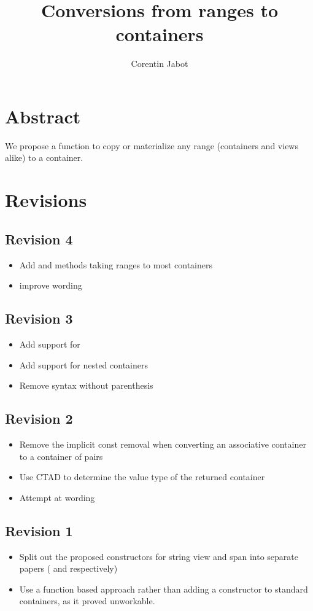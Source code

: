 \documentclass{wg21}
\title{Conversions from ranges to containers}
\author{Corentin Jabot}{corentin.jabot@gmail.com}
\begin{document}
\maketitle

\section{Abstract}

We propose a function to copy or materialize any range (containers and views alike) to a container.

\section{Revisions}

\subsection*{Revision 4}
\begin{itemize}
    \item Add  and methods taking ranges to most containers
    \item improve wording
\end{itemize}

\subsection*{Revision 3}
\begin{itemize}
    \item Add support for 
    \item Add support for nested containers
    \item Remove syntax without parenthesis
\end{itemize}

\subsection*{Revision 2}
\begin{itemize}
	\item Remove the implicit const removal when converting an associative container to a container of pairs
	\item Use CTAD to determine the value type of the returned container
	\item Attempt at wording
\end{itemize}

\subsection*{Revision 1}
\begin{itemize}
	\item Split out the proposed constructors for string view and span into separate papers (\cite{P1391} and \cite{P1394} respectively)
	\item Use a function based approach rather than adding a constructor to standard containers, as it proved unworkable.
\end{itemize}
\end{document}
